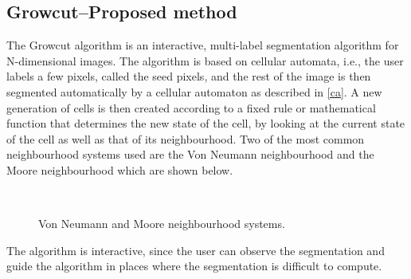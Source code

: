 \documentclass[a4paper,10pt]{article}
\begin{document}
\subsection{Growcut--Proposed method}
\label{growcut}
The Growcut algorithm is an interactive, multi-label segmentation algorithm
for N-dimensional images.  The algorithm is based on cellular automata, i.e.,
the user labels a few pixels, called the seed pixels, and the rest of the image is then segmented
automatically by a cellular automaton as described in \ref{ca}. 
A new generation of cells is then created according to a fixed rule or
mathematical function that determines the new state of the cell, by looking at
the current state of the cell as well
as that of its neighbourhood.  Two of the most common neighbourhood systems used are the Von
Neumann neighbourhood and the Moore neighbourhood which are shown below. \\

\begin{figure}[H]
\centering
\mbox{ \quad
{}} \caption{Von Neumann and
Moore neighbourhood systems\cite{n}.}
\end{figure}

The algorithm is interactive, since the user can observe the segmentation and
guide the algorithm in places where the segmentation is difficult to compute.
\\
\end{document}
